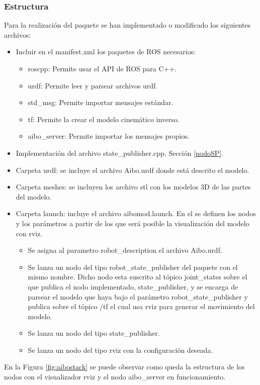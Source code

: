 \documentclass[12pt,a4paper,final,twoside]{article}
\begin{document}
\subsubsection{Estructura}
Para la realización del paquete se han implementado o modificado los siguientes archivos:
\begin{itemize}
\item Incluir en el manifest.xml los paquetes de ROS necesarios:
\begin{itemize}
\item roscpp: Permite usar el API de ROS para C++.
\item urdf: Permite leer y parsear archivos urdf.
\item std{\_}msg: Permite importar mensajes estándar.
\item tf: Permite la crear el modelo cinemático inverso.
\item aibo{\_}server: Permite importar los mensajes propios.  
\end{itemize}
\item Implementación del archivo state{\_}publisher.cpp, Sección \ref{nodoSP}.
\item Carpeta urdf: se incluye el archivo Aibo.urdf donde está descrito el modelo.
\item Carpeta meshes: se incluyen los archivo stl con los modelos 3D de las partes del modelo.
\item Carpeta launch: incluye el archivo aibomod.launch. En el se definen los nodos y los parámetros a partir de los que será posible la visualización del modelo con rviz.
\begin{itemize}
\item Se asigna al parametro robot{\_}description el archivo Aibo.urdf.
\item Se lanza un nodo del tipo robot{\_}state{\_}publisher del paquete con el mismo nombre. Dicho nodo esta suscrito al tópico joint{\_}states sobre el que publica el nodo implementado, state{\_}publisher, y se encarga de parsear el modelo que haya bajo el parámetro robot{\_}state{\_}publisher y publica sobre el tópico /tf el cual usa rviz para generar el movimiento del modelo.
\item Se lanza un nodo del tipo state{\_}publisher.
\item Se lanza un nodo del tipo rviz con la configuración deseada.
\end{itemize}
\end{itemize}

En la Figura \ref{fig:aibostack} se puede observar como queda la estructura de los nodos con el visualizador rviz y el nodo aibo{\_}server en funcionamiento.
\end{document}
